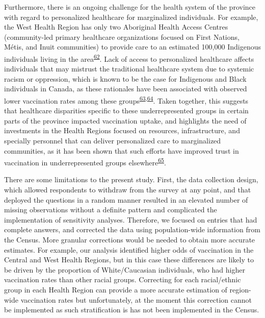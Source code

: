 \documentclass[
]{article}
\begin{document}
Furthermore, there is an ongoing challenge for the health system of the
province with regard to personalized healthcare for marginalized
individuals. For example, the West Health Region has only two Aboriginal
Health Access Centres (community-led primary healthcare organizations
focused on First Nations, Métis, and Inuit communities) to provide care
to an estimated 100,000 Indigenous individuals living in the
area\textsuperscript{\protect\hyperlink{ref-ontariohealth}{62}}. Lack of
access to personalized healthcare affects individuals that may mistrust
the traditional healthcare system due to systemic racism or oppression,
which is known to be the case for Indigenous and Black individuals in
Canada, as these rationales have been associated with observed lower
vaccination rates among these
groups\textsuperscript{\protect\hyperlink{ref-smylie2022}{63},\protect\hyperlink{ref-eissa2021}{64}}.
Taken together, this suggests that healthcare disparities specific to
these underrepresented groups in certain parts of the province impacted
vaccination uptake, and highlights the need of investments in the Health
Regions focused on resources, infrastructure, and specially personnel
that can deliver personalized care to marginalized communities, as it
has been shown that such efforts have improved trust in vaccination in
underrepresented groups
elsewhere\textsuperscript{\protect\hyperlink{ref-schafferderoo2020}{65}}.

There are some limitations to the present study. First, the data
collection design, which allowed respondents to withdraw from the survey
at any point, and that deployed the questions in a random manner
resulted in an elevated number of missing observations without a
definite pattern and complicated the implementation of sensitivity
analyses. Therefore, we focused on entries that had complete answers,
and corrected the data using population-wide information from the
Census. More granular corrections would be needed to obtain more
accurate estimates. For example, our analysis identified higher odds of
vaccination in the Central and West Health Regions, but in this case
these differences are likely to be driven by the proportion of
White/Caucasian individuals, who had higher vaccination rates than other
racial groups. Correcting for each racial/ethnic group in each Health
Region can provide a more accurate estimation of region-wide vaccination
rates but unfortunately, at the moment this correction cannot be
implemented as such stratification is has not been implemented in the
Census.
\end{document}
